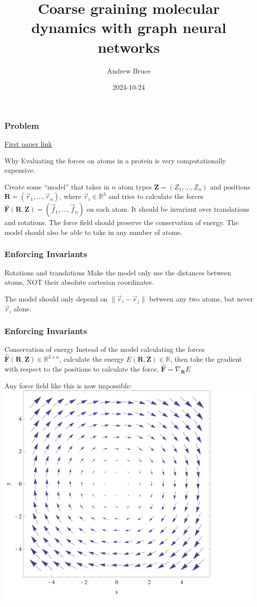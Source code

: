 \documentclass{beamer}
\title{Coarse graining molecular dynamics with graph neural networks}
\author{Andrew Bruce\inst{1}}
\institute[UCSC] {
  \inst{1}
  University Of California, Santa Cruz
}
\date{2024-10-24}
\begin{document}
\frame{\titlepage}
\begin{frame}
  \frametitle{Problem}
  \href{https://arxiv.org/abs/1706.08566}{First paper link}
  \begin{block}{Why}
    Evaluating the forces on atoms in a protein is very computationally expensive.
  \end{block}
  Create some ``model'' that takes in $n$ atom types $\mathbf{Z} = ( Z_1, \dots, Z_n)$ and positions $\mathbf{R} = ( \vec{r}_1, \dots, \vec{r}_n )$, where $ \vec{r}_i \in \mathbb{R}^3$ and tries to calculate the forces $\mathbf{\hat{F}}(\mathbf{R}, \mathbf{Z}) = ( \vec{f}_1, \dots, \vec{f}_n )$ on each atom. It should be \alert{invariant} over translations and rotations. The force field should preserve the conservation of energy. The model should also be able to take in \alert{any number} of atoms.
\end{frame}
\begin{frame}
  \frametitle{Enforcing Invariants}
  \begin{block}{Rotations and translations}
    Make the model only use the distances between atoms, \alert{NOT} their absolute cartesian coordinates.
  \end{block}
  The model should only depend on $\| \vec{r}_i - \vec{r}_j \|$ between any two atoms, but \alert{never} $\vec{r}_i$ alone.
\end{frame}
\begin{frame}
  \frametitle{Enforcing Invariants}
  \begin{block}{Conservation of energy}
    Instead of the model calculating the forces $\mathbf{\hat{F}}(\mathbf{R}, \mathbf{Z}) \in \mathbb{R}^{3 \times n}$, calculate the energy $E(\mathbf{R}, \mathbf{Z}) \in \mathbb{R}$, then take the \alert{gradient with respect to the positions} to calculate the force.
    $\mathbf{\hat{F}} = \nabla_{\mathbf{R}} E$
  \end{block}
  Any force field like this is now impossible: \includegraphics[width=0.35\linewidth]{./curl.png}
\end{frame}
\end{document}
